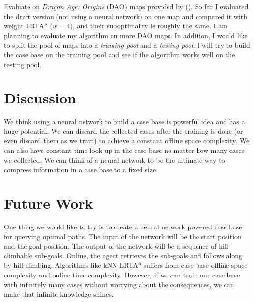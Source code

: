 \documentclass[letterpaper]{article}
\newcommand{\citea}[1]{\citeauthor{#1} (\citeyear{#1})}
\numberwithin{equation}{section}
\numberwithin{theorem}{section}
\numberwithin{lemma}{section}
\numberwithin{df}{section}
\begin{document}
    Evaluate on \textit{Dragon Age: Origins} (DAO) maps provided by \citea{benchmarks}.
    So far I evaluated the draft version (not using a neural network) on one map and compared it with weight LRTA* ($w = 4$), and their suboptimality is roughly the same.
    I am planning to evaluate my algorithm on more DAO maps.
    In addition, I would like to split the pool of maps into a \textit{training pool} and a \textit{testing pool}.
    I will try to build the case base on the training pool and see if the algorithm works well on the testing pool.


    \section{Discussion}\label{sec:discussion}


    We think using a neural network to build a case base is powerful idea and has a huge potential.
    We can discard the collected cases after the training is done (or even discard them as we train) to achieve a constant offline space complexity.
    We can also have constant time look up in the case base no matter how many cases we collected.
    We can think of a neural network to be the ultimate way to compress information in a case
    base to a fixed size.


    \section{Future Work}\label{sec:future-work}


    One thing we would like to try is to create a neural network powered case base for querying optimal paths.
    The input of the network will be the start position and the goal position.
    The output of the network will be a sequence of hill-climbable sub-goals.
    Online, the agent retrieves the sub-goals and follows along by hill-climbing.
    Algorithms like kNN LRTA* suffers from case base offline space complexity and online time complexity.
    However, if we can train our case base with infinitely many cases without worrying about the consequences, we can make that infinite knowledge shines.
\end{document}
